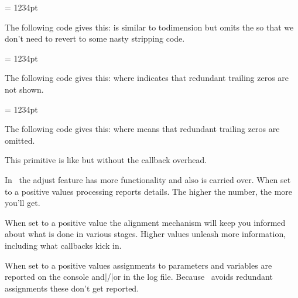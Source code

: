 \startbuffer
\scratchdimen = 1234pt \toscaled\scratchdimen
\stopbuffer

The following code gives this: {\nospacing\inlinebuffer} is similar to \prm
{todimension} but omits the  so that we don't need to revert to some
nasty stripping code.

\typebuffer

\stopnewprimitive

\startnewprimitive[title={\prm {tosparsedimension}}]

\startbuffer
\scratchdimen = 1234pt \tosparsedimension\scratchdimen
\stopbuffer

The following code gives this: {\nospacing\inlinebuffer} where 
indicates that redundant trailing zeros are not shown.

\typebuffer

\stopnewprimitive

\startnewprimitive[title={\prm {tosparsescaled}}]

\startbuffer
\scratchdimen = 1234pt \tosparsescaled\scratchdimen
\stopbuffer

The following code gives this: {\nospacing\inlinebuffer} where 
means that redundant trailing zeros are omitted.

\typebuffer

\stopnewprimitive

\startnewprimitive[title={\prm {tpack}}]

This primitive is like  but without the callback overhead.

\stopnewprimitive

\startnewprimitive[title={\prm {tracingadjusts}}]

In \LUAMETATEX\ the adjust feature has more functionality and also is carried
over. When set to a positive values  processing reports details.
The higher the number, the more you'll get.

\stopnewprimitive

\startnewprimitive[title={\prm {tracingalignments}}]

When set to a positive value the alignment mechanism will keep you informed about
what is done in various stages. Higher values unleash more information, including
what callbacks kick in.

\stopnewprimitive

\startoldprimitive[title={\prm {tracingassigns}}]

When set to a positive values assignments to parameters and variables are
reported on the console and|/|or in the log file. Because \LUAMETATEX\ avoids
redundant assignments these don't get reported.

